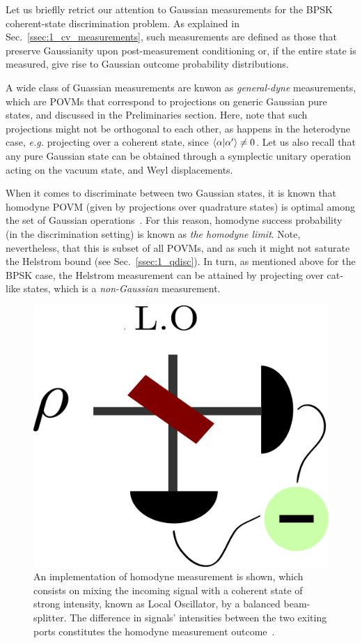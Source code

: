Let us brieflly retrict our attention to Gaussian measurements for the BPSK coherent-state discrimination problem. As explained in Sec.~\ref{ssec:1_cv_measurements}, such measurements are defined as those that preserve Gaussianity upon post-measurement conditioning or, if the entire state is measured, give rise to Gaussian outcome probability distributions.

A wide class of Guassian measurements are knwon as \textit{general-dyne} measurements, which are POVMs that correspond to projections on generic Gaussian pure states, and discussed in the Preliminaries section. Here, note that such projections might not be orthogonal to each other, as happens in the heterodyne case, \textit{e.g.} projecting over a coherent state, since $\mathinner{\langle \alpha|\alpha'\rangle}\neq0$. Let us also recall that any pure Gaussian state can be obtained through a symplectic unitary operation acting on the vacuum state, and Weyl displacements.

When it comes to discriminate between two Gaussian states, it is known that homodyne POVM (given by projections over quadrature states) is optimal among the set of Gaussian operations~\cite{Limit2021Roberson,opGaussDet, Winter2021Bosonic}. For this reason, homodyne success probability (in the discrimination setting) is known as \textit{the homodyne limit}. Note, nevertheless, that this is subset of all POVMs, and as such it might not saturate the Helstrom bound (see Sec.~\ref{ssec:1_qdisc}). In turn, as mentioned above for the BPSK case, the Helstrom measurement can be attained by projecting over cat-like states, which is a \textit{non-Gaussian} measurement.

\begin{figure}[t!]
    \centering
    \includegraphics[width=.45\textwidth]{Figures/312/receiver_homodyne.pdf}
    \caption{An implementation of homodyne measurement is shown, which consists on mixing the incoming signal with a coherent state of strong intensity, known as Local Oscillator, by a balanced beam-splitter. The difference in signals' intensities between the two exiting ports constitutes the homodyne measurement outcome~\cite{serafiniBOOK}.}
    \label{fig:homodynereceiver}
\end{figure}

